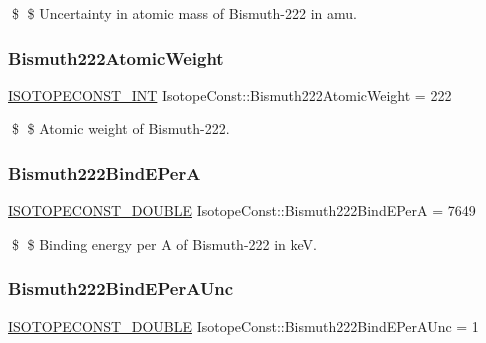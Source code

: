 \$ \$ Uncertainty in atomic mass of Bismuth-\/222 in amu. \mbox{\label{group___isotope_const-_bismuth-_bi222_ga677251ada977875e748df24f46b1451c}} 
\subsubsection{\texorpdfstring{Bismuth222\+Atomic\+Weight}{Bismuth222AtomicWeight}}
{\footnotesize\ttfamily \mbox{\hyperlink{group___isotope_const-_macros_ga5f18360b3e99483a35c32d789e62621c}{I\+S\+O\+T\+O\+P\+E\+C\+O\+N\+S\+T\+\_\+\+I\+NT}} Isotope\+Const\+::\+Bismuth222\+Atomic\+Weight = 222}

\$ \$ Atomic weight of Bismuth-\/222. \mbox{\label{group___isotope_const-_bismuth-_bi222_ga32d8bc43421bccf1e84380bed6d4f68a}} 
\subsubsection{\texorpdfstring{Bismuth222\+Bind\+E\+PerA}{Bismuth222BindEPerA}}
{\footnotesize\ttfamily \mbox{\hyperlink{group___isotope_const-_macros_ga8f45a7272ce02c0b4c65c44636ed719a}{I\+S\+O\+T\+O\+P\+E\+C\+O\+N\+S\+T\+\_\+\+D\+O\+U\+B\+LE}} Isotope\+Const\+::\+Bismuth222\+Bind\+E\+PerA = 7649}

\$ \$ Binding energy per A of Bismuth-\/222 in keV. \mbox{\label{group___isotope_const-_bismuth-_bi222_gae6b2658cc157ceb3cf63345ed01ead45}} 
\subsubsection{\texorpdfstring{Bismuth222\+Bind\+E\+Per\+A\+Unc}{Bismuth222BindEPerAUnc}}
{\footnotesize\ttfamily \mbox{\hyperlink{group___isotope_const-_macros_ga8f45a7272ce02c0b4c65c44636ed719a}{I\+S\+O\+T\+O\+P\+E\+C\+O\+N\+S\+T\+\_\+\+D\+O\+U\+B\+LE}} Isotope\+Const\+::\+Bismuth222\+Bind\+E\+Per\+A\+Unc = 1}

